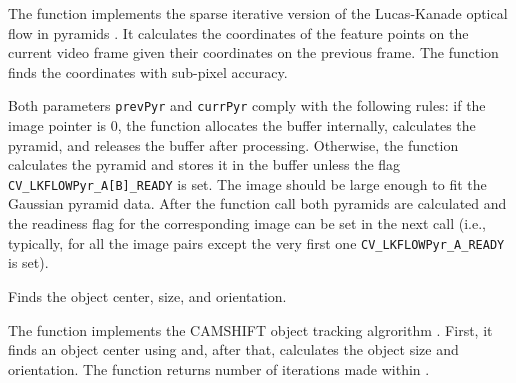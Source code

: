 The function implements the sparse iterative version of the Lucas-Kanade optical flow in pyramids
. It calculates the coordinates of the feature points on the current video
frame given their coordinates on the previous frame. The function finds
the coordinates with sub-pixel accuracy.

Both parameters \texttt{prevPyr} and \texttt{currPyr} comply with the
following rules: if the image pointer is 0, the function allocates the
buffer internally, calculates the pyramid, and releases the buffer after
processing. Otherwise, the function calculates the pyramid and stores
it in the buffer unless the flag \texttt{CV\_LKFLOWPyr\_A[B]\_READY}
is set. The image should be large enough to fit the Gaussian pyramid
data. After the function call both pyramids are calculated and the
readiness flag for the corresponding image can be set in the next call
(i.e., typically, for all the image pairs except the very first one
\texttt{CV\_LKFLOWPyr\_A\_READY} is set).


Finds the object center, size, and orientation.


\begin{description}
\end{description}

The function implements the CAMSHIFT object tracking algrorithm
.
First, it finds an object center using  and, after that, calculates the object size and orientation. The function returns number of iterations made within .

